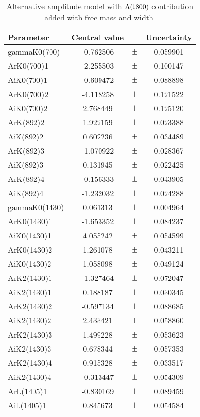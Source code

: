 \clearpage

\begin{table}
\centering
\caption{Alternative amplitude model with ${\Lambda}(1800)$ contribution added with free mass and width.}
\begin{tiny}
\begin{tabular}{lccc}
\toprule
Parameter & Central value & & Uncertainty\\
\midrule 
gammaK0(700) & -0.762506 & $\pm$ & 0.059901 \\
ArK0(700)1 & -2.255503 & $\pm$ & 0.100147 \\
AiK0(700)1 & -0.609472 & $\pm$ & 0.088898 \\
ArK0(700)2 & -4.118258 & $\pm$ & 0.121522 \\
AiK0(700)2 & 2.768449 & $\pm$ & 0.125120 \\
ArK(892)2 & 1.922159 & $\pm$ & 0.023388 \\
AiK(892)2 & 0.602236 & $\pm$ & 0.034489 \\
ArK(892)3 & -1.070922 & $\pm$ & 0.028367 \\
AiK(892)3 & 0.131945 & $\pm$ & 0.022425 \\
ArK(892)4 & -0.156333 & $\pm$ & 0.043905 \\
AiK(892)4 & -1.232032 & $\pm$ & 0.024288 \\
gammaK0(1430) & 0.061313 & $\pm$ & 0.004964 \\
ArK0(1430)1 & -1.653352 & $\pm$ & 0.084237 \\
AiK0(1430)1 & 4.055242 & $\pm$ & 0.054599 \\
ArK0(1430)2 & 1.261078 & $\pm$ & 0.043211 \\
AiK0(1430)2 & 1.058098 & $\pm$ & 0.049124 \\
ArK2(1430)1 & -1.327464 & $\pm$ & 0.072047 \\
AiK2(1430)1 & 0.188187 & $\pm$ & 0.030345 \\
ArK2(1430)2 & -0.597134 & $\pm$ & 0.088685 \\
AiK2(1430)2 & 2.433421 & $\pm$ & 0.058860 \\
ArK2(1430)3 & 1.499228 & $\pm$ & 0.053623 \\
AiK2(1430)3 & 0.678344 & $\pm$ & 0.057353 \\
ArK2(1430)4 & 0.915328 & $\pm$ & 0.033517 \\
AiK2(1430)4 & -0.313447 & $\pm$ & 0.054309 \\
ArL(1405)1 & -0.830169 & $\pm$ & 0.089459 \\
AiL(1405)1 & 0.845673 & $\pm$ & 0.054584 \\

\end{tabular}
\end{tiny}
\end{table}
